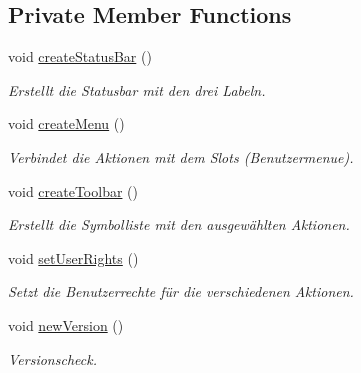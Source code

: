 \subsection*{Private Member Functions}
\begin{CompactItemize}
\item 
void \hyperlink{class_b_e_o___timing_8f8ee452bed83bd1eb01ba25f3074232}{createStatusBar} ()
\begin{CompactList}\small\item\em Erstellt die Statusbar mit den drei Labeln. \item\end{CompactList}\item 
void \hyperlink{class_b_e_o___timing_63c37dc34b4caddfea648850ce260c28}{createMenu} ()
\begin{CompactList}\small\item\em Verbindet die Aktionen mit dem Slots (Benutzermenue). \item\end{CompactList}\item 
void \hyperlink{class_b_e_o___timing_7f935167b5af6676da6cf85084118575}{createToolbar} ()
\begin{CompactList}\small\item\em Erstellt die Symbolliste mit den ausgewählten Aktionen. \item\end{CompactList}\item 
void \hyperlink{class_b_e_o___timing_cd12cfc862cb158f92a7500f836783c7}{setUserRights} ()
\begin{CompactList}\small\item\em Setzt die Benutzerrechte für die verschiedenen Aktionen. \item\end{CompactList}\item 
void \hyperlink{class_b_e_o___timing_fa8e65c455ffd3b02112fdd4e6e76878}{newVersion} ()
\begin{CompactList}\small\item\em Versionscheck. \item\end{CompactList}\end{CompactItemize}
